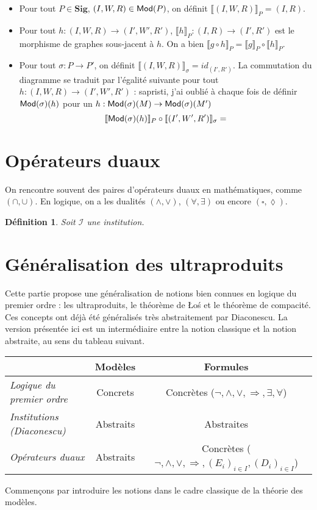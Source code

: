 \documentclass[11pt,a4paper]{article}
\newtheorem{defi}[theo]{Définition}
\newcommand{\itemz}{\item[$\triangleright$]}
\newcommand{\gr}{\textbf}
\newcommand{\il}{\textit}
\newcommand{\I}{\mathcal{I}}
\newcommand{\lb}{\llbracket}
\newcommand{\rb}{\rrbracket}
\newcommand{\info}[1]{\text{{\fontfamily{lmss}\selectfont #1}}}
\newcommand{\Mod}{\info{Mod}}
\newcommand{\1}{\mathbbm{1}}
\begin{document}
\begin{itemize}
\setlength\itemsep{-0.3em}
\itemz Pour tout $P \in \gr{Sig}$, $(I,W,R) \in \Mod(P)$, on définit $\lb (I,W,R) \rb_P = (I,R)$.
\itemz Pour tout $h : (I,W,R) \to (I',W',R')$, $\lb h \rb_P : (I,R) \to (I',R')$ est le morphisme de graphes sous-jacent à $h$. On a bien $\lb g \circ h \rb_P = \lb g \rb_P \circ \lb h \rb_P$.
\itemz Pour tout $\sigma : P \to P'$, on définit $\lb (I,W,R) \rb_\sigma = id_{(I',R')}$. La commutation du diagramme se traduit par l'égalité suivante pour tout $h : (I,W,R) \to (I',W',R')$ : sapristi, j'ai oublié à chaque fois de définir $\Mod(\sigma)(h)$ pour un $h : \Mod(\sigma)(M) \to \Mod(\sigma)(M')$
\[ \lb \Mod(\sigma)(h) \rb_P \circ \lb (I',W',R') \rb_\sigma =  \]
\end{itemize}
\newpage
\section{Opérateurs duaux}
On rencontre souvent des paires d'opérateurs duaux en mathématiques, comme $(\cap,\cup)$. En logique, on a les dualités $(\wedge,\vee)$, $(\forall,\exists)$ ou encore $(\square,\lozenge)$.
\begin{defi}
Soit $\I$ une institution.
\end{defi}
\newpage
\section{Généralisation des ultraproduits}
Cette partie propose une généralisation de notions bien connues en logique du premier ordre : les ultraproduits, le théorème de \L o\'s et le théorème de compacité. Ces concepts ont déjà été généralisés très abstraitement par Diaconescu. La version présentée ici est un intermédiaire entre la notion classique et la notion abstraite, au sens du tableau suivant.
\begin{center}
\begin{tabular}{|l|c|c|}
  \hline
   & \gr{Modèles} & \gr{Formules} \\
  \hline
  \il{Logique du premier ordre} & Concrets & Concrètes ($\neg,\wedge,\vee,\Rightarrow,\exists,\forall$)\\
  \hline
  \il{Institutions (Diaconescu)} & Abstraits & Abstraites \\
  \hline
  \il{Opérateurs duaux} & Abstraits & Concrètes ($\neg,\wedge,\vee,\Rightarrow,(E_i)_{i\in I},(D_i)_{i\in I}$) \\
  \hline
\end{tabular}
\end{center}
Commençons par introduire les notions dans le cadre classique de la théorie des modèles.
\end{document}
